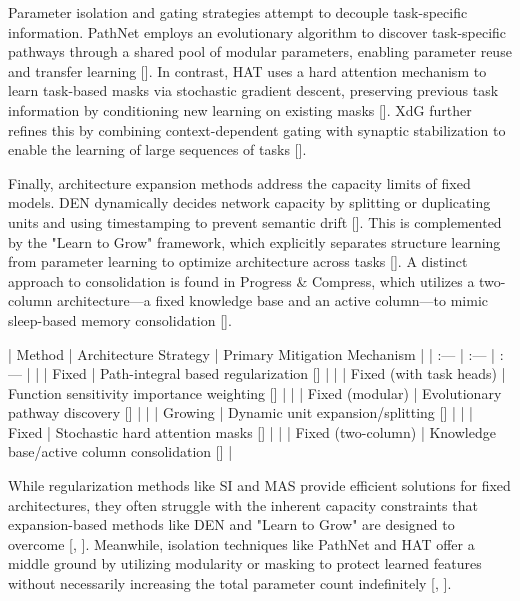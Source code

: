 \documentclass[11pt]{article}
\begin{document}
Parameter isolation and gating strategies attempt to decouple task-specific information. PathNet employs an evolutionary algorithm to discover task-specific pathways through a shared pool of modular parameters, enabling parameter reuse and transfer learning [\citep{1701.08734}]. In contrast, HAT uses a hard attention mechanism to learn task-based masks via stochastic gradient descent, preserving previous task information by conditioning new learning on existing masks [\citep{1801.01423}]. XdG further refines this by combining context-dependent gating with synaptic stabilization to enable the learning of large sequences of tasks [\citep{1802.01569}].

Finally, architecture expansion methods address the capacity limits of fixed models. DEN dynamically decides network capacity by splitting or duplicating units and using timestamping to prevent semantic drift [\citep{1708.01547}]. This is complemented by the "Learn to Grow" framework, which explicitly separates structure learning from parameter learning to optimize architecture across tasks [\citep{1904.00310}]. A distinct approach to consolidation is found in Progress \& Compress, which utilizes a two-column architecture—a fixed knowledge base and an active column—to mimic sleep-based memory consolidation [\citep{1805.06370}].

| Method | Architecture Strategy | Primary Mitigation Mechanism |
| :--- | :--- | :--- |
| \citep{1703.04200} | Fixed | Path-integral based regularization [\citep{1703.04200}] |
| \citep{1711.09601} | Fixed (with task heads) | Function sensitivity importance weighting [\citep{1711.09601}] |
| \citep{1701.08734} | Fixed (modular) | Evolutionary pathway discovery [\citep{1701.08734}] |
| \citep{1708.01547} | Growing | Dynamic unit expansion/splitting [\citep{1708.01547}] |
| \citep{1801.01423} | Fixed | Stochastic hard attention masks [\citep{1801.01423}] |
| \citep{1805.06370} | Fixed (two-column) | Knowledge base/active column consolidation [\citep{1805.06370}] |

While regularization methods like SI and MAS provide efficient solutions for fixed architectures, they often struggle with the inherent capacity constraints that expansion-based methods like DEN and "Learn to Grow" are designed to overcome [\citep{1708.01547}, \citep{1904.00310}]. Meanwhile, isolation techniques like PathNet and HAT offer a middle ground by utilizing modularity or masking to protect learned features without necessarily increasing the total parameter count indefinitely [\citep{1701.08734}, \citep{1801.01423}].
\end{document}
